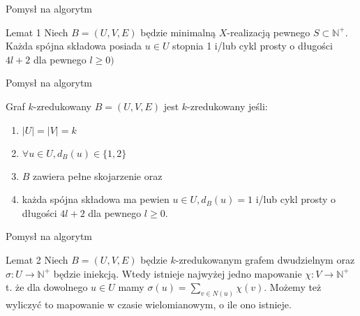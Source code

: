 \documentclass{beamer}
\newcommand{\N}{\mathbb{N}}
\begin{document}
		\begin{frame}{Pomysł na algorytm}
			\begin{exampleblock}{Lemat 1}
                Niech $ B = (U,V,E) $ będzie minimalną $ X $-realizacją pewnego $ S \subset \N^{+} $.
                Każda spójna składowa posiada $ u \in U $ stopnia 1 i/lub cykl prosty o długości $ 4l + 2 $ dla pewnego $ l \geq 0 ) $
            \end{exampleblock}
		\end{frame}
		
		\begin{frame}{Pomysł na algorytm}
            \begin{block}{Graf $ k $-zredukowany}
                $ B = (U,V,E) $ jest $ k $-zredukowany jeśli:
                \begin{enumerate}
                    \pause \item $ |U| = |V| = k $
                    \pause \item $ \forall u \in U, d_{B}(u) \in \lbrace 1, 2 \rbrace $
                    \pause\item $ B $ zawiera pełne skojarzenie
                    oraz
                    \pause \item każda spójna składowa ma pewien $ u \in U, d_{B}(u) = 1 $ i/lub cykl prosty o długości $ 4l + 2 $ dla pewnego $ l \geq 0 $.
                \end{enumerate}
            \end{block}
		\end{frame}

		\begin{frame}{Pomysł na algorytm}
			\begin{exampleblock}{Lemat 2}
                Niech $ B = (U,V,E) $ będzie $ k $-zredukowanym grafem dwudzielnym oraz $ \sigma : U \rightarrow \N^{+} $ będzie iniekcją.
                Wtedy istnieje najwyżej jedno mapowanie $ \chi : V \rightarrow \N^{+} $ t. że dla dowolnego $ u \in U $ mamy $ \sigma(u) = \sum_{v \in N(u)}\chi(v) $. Możemy też wyliczyć to mapowanie w czasie wielomianowym, o ile ono istnieje.
            \end{exampleblock}
		\end{frame}
		
\end{document}
